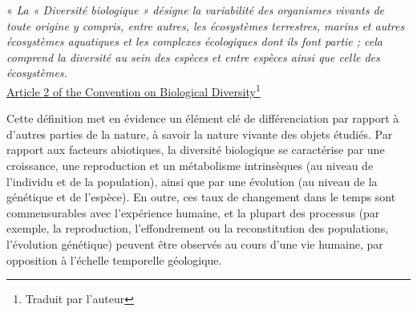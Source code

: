 \begin{displayquote}
\begin{displayquote}
\begin{displayquote}
{\begin{displayquote}
« \textit{ La « Diversité biologique » désigne la variabilité des organismes vivants de toute origine y compris, entre autres, les écosystèmes terrestres, marins et autres écosystèmes aquatiques et les complexes écologiques dont ils font partie ; cela comprend la diversité au sein des espèces et entre espèces ainsi que celle des écosystèmes.}\\
\hspace*{\fill} \small{\href{https://www.cbd.int/convention/articles/default.shtml?a=cbd-02}{Article 2 of the Convention on Biological Diversity}}\footnote{Traduit par l'auteur}
\end{displayquote}

Cette définition met en évidence un élément clé de différenciation par rapport à d'autres parties de la nature, à savoir la nature vivante des objets étudiés. Par rapport aux facteurs abiotiques, la diversité biologique se caractérise par une croissance, une reproduction et un métabolisme intrinsèques (au niveau de l'individu et de la population), ainsi que par une évolution (au niveau de la génétique et de l'espèce). En outre, ces taux de changement dans le temps sont commensurables avec l'expérience humaine, et la plupart des processus (par exemple, la reproduction, l'effondrement ou la reconstitution des populations, l'évolution génétique) peuvent être observés au cours d'une vie humaine, par opposition à l'échelle temporelle géologique. 

}
\end{displayquote}
\end{displayquote}
\end{displayquote}
